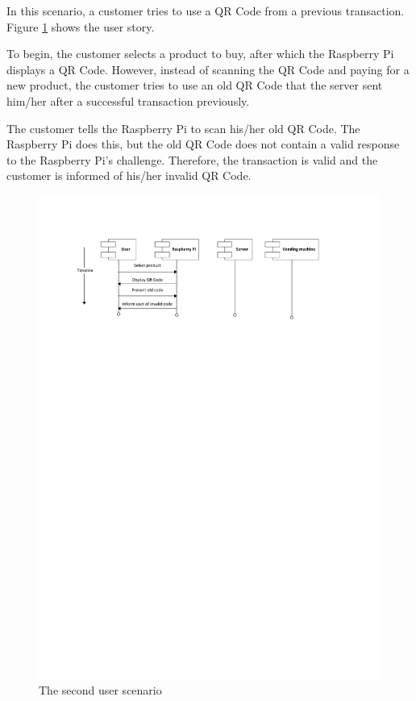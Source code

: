 In this scenario, a customer tries to use a QR Code from a previous transaction. Figure
\ref{fig:test2} shows the user story.

To begin, the customer selects a product to buy, after which the Raspberry Pi displays a
QR Code. However, instead of scanning the QR Code and paying for a new product, the
customer tries to use an old QR Code that the server sent him/her after a successful
transaction previously. 

The customer tells the Raspberry Pi to scan his/her old QR Code. The Raspberry Pi does
this, but the old QR Code does not contain a valid response to the Raspberry Pi's
challenge. Therefore, the transaction is valid and the customer is informed of his/her
invalid QR Code.

\begin{figure}
 \centering 
 \includegraphics[clip=true, trim = 0 620 0 50,
 scale=0.7]{user_story_2}
 \caption{The second user scenario}
 \label{fig:test2}
\end{figure}

